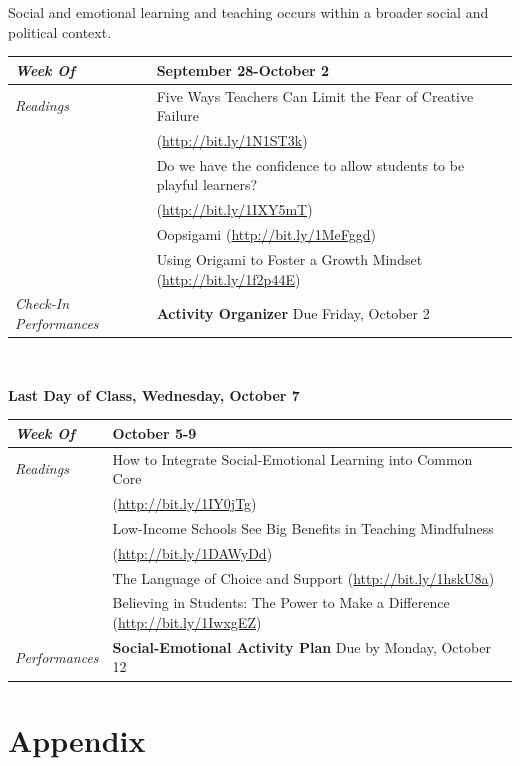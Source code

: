\documentclass[two-side]{tufte-handout}
\newcommand{\gentopic}[1]{\begin{fullwidth}\begin{center}\faKey \textsf{#1}\end{center}\end{fullwidth}}
\newcommand{\tabread}{\faBook\medspace\textit{Readings}}
\newcommand{\tabperformance}{\faTasks\medspace\textit{Performances}}
\newcommand{\tabdt}{\faCalendar\medspace\textit{Week Of}}
\newcommand{\tabcheckin}{\faCheckSquareO\medspace\textit{Check-In Performances}}
\newcommand{\tabbreak}{\begin{fullwidth}\begin{center}\faAsterisk\faAsterisk\faAsterisk\\\end{center}\end{fullwidth}}
\newenvironment{tabsched}
	{\small
	\begin{tabular}{p{1.5in}p{4.5in}}
	\midrule}
	{\midrule
	\end{tabular}
	\normalsize}
\newcommand{\weekseven}{September 28-October 2}
\newcommand{\weekeight}{October 5-9}
\newcommand{\finisemester}{\begin{fullwidth}\begin{center}\large\textbf{\faFlagCheckered Last Day of Class, Wednesday, October 7 \faFlagCheckered}\normalsize\end{center}\end{fullwidth}}
\begin{document}
\gentopic{Social and emotional learning and teaching occurs within a broader social and political context.}

\begin{tabsched}
	\tabdt & \weekseven \\
	\midrule
	\tabread & Five Ways Teachers Can Limit the Fear of Creative Failure \\
	& (\url{http://bit.ly/1N1ST3k}) \\
	& Do we have the confidence to allow students to be playful learners? \\
	& (\url{http://bit.ly/1IXY5mT}) \\
	& Oopsigami (\url{http://bit.ly/1MeFggd}) \\
	& Using Origami to Foster a Growth Mindset (\url{http://bit.ly/1f2p44E}) \\
	\midrule
	\tabcheckin & \textbf{Activity Organizer} Due Friday, October 2 \\
\end{tabsched}

\tabbreak

\finisemester

\begin{tabsched}
	\tabdt & \weekeight \\
	\midrule
	\tabread & How to Integrate Social-Emotional Learning into Common Core \\
	& (\url{http://bit.ly/1IY0jTg}) \\
	& Low-Income Schools See Big Benefits in Teaching Mindfulness \\
	& (\url{http://bit.ly/1DAWyDd}) \\
	& The Language of Choice and Support (\url{http://bit.ly/1hskU8a}) \\
	& Believing in Students: The Power to Make a Difference (\url{http://bit.ly/1IwxgEZ}) \\
	\midrule
	\tabperformance & \textbf{Social-Emotional Activity Plan} Due by Monday, October 12 \\
\end{tabsched}

\newpage

\part{Appendix}
\end{document}
